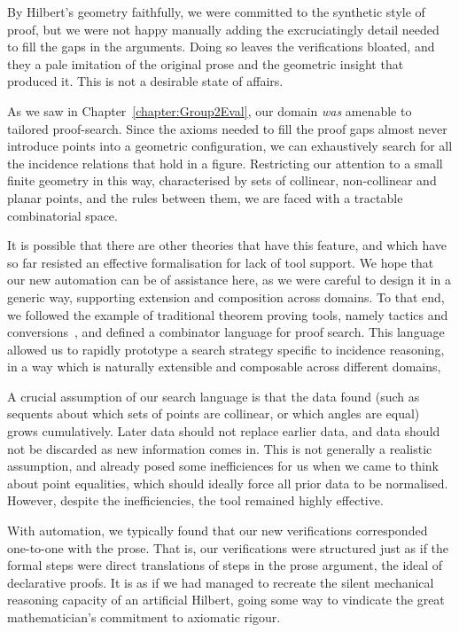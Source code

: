 By Hilbert's geometry faithfully, we were committed to the synthetic style of proof, but we were not happy manually adding the excruciatingly detail needed to fill the gaps in the arguments. Doing so leaves the verifications bloated, and they a pale imitation of the original prose and the geometric insight that produced it. This is not a desirable state of affairs.

As we saw in Chapter~\ref{chapter:Group2Eval}, our domain \emph{was} amenable to tailored proof-search. Since the axioms needed to fill the proof gaps almost never introduce points into a geometric configuration, we can exhaustively search for all the incidence relations that hold in a figure. Restricting our attention to a small finite geometry in this way, characterised by sets of collinear, non-collinear and planar points, and the rules between them, we are faced with a tractable combinatorial space.

It is possible that there are other theories that have this feature, and which have so far resisted an effective formalisation for lack of tool support. We hope that our new automation can be of assistance here, as we were careful to design it in a generic way, supporting extension and composition across domains. To that end, we followed the example of traditional theorem proving tools, namely tactics and conversions~\cite{Tactics}, and defined a combinator language for proof search. This language allowed us to rapidly prototype a search strategy specific to incidence reasoning, in a way which is naturally extensible and composable across different domains, 

A crucial assumption of our search language is that the data found (such as sequents about which sets of points are collinear, or which angles are equal) grows cumulatively. Later data should not replace earlier data, and data should not be discarded as new information comes in. This is not generally a realistic assumption, and already posed some inefficiences for us when we came to think about point equalities, which should ideally force all prior data to be normalised. However, despite the inefficiencies, the tool remained highly effective.

With automation, we typically found that our new verifications corresponded one-to-one with the prose. That is, our verifications were structured just as if the formal steps were direct translations of steps in the prose argument, the ideal of declarative proofs. It is as if we had managed to recreate the silent mechanical reasoning capacity of an artificial Hilbert, going some way to vindicate the great mathematician's commitment to axiomatic rigour.

